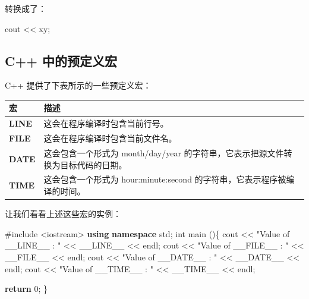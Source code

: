 \documentclass[
]{article}
\newenvironment{Shaded}{}{}
\newcommand{\ControlFlowTok}[1]{\textcolor[rgb]{0.00,0.44,0.13}{\textbf{#1}}}
\newcommand{\DataTypeTok}[1]{\textcolor[rgb]{0.56,0.13,0.00}{#1}}
\newcommand{\DecValTok}[1]{\textcolor[rgb]{0.25,0.63,0.44}{#1}}
\newcommand{\ImportTok}[1]{#1}
\newcommand{\KeywordTok}[1]{\textcolor[rgb]{0.00,0.44,0.13}{\textbf{#1}}}
\newcommand{\NormalTok}[1]{#1}
\newcommand{\OperatorTok}[1]{\textcolor[rgb]{0.40,0.40,0.40}{#1}}
\newcommand{\OtherTok}[1]{\textcolor[rgb]{0.00,0.44,0.13}{#1}}
\newcommand{\PreprocessorTok}[1]{\textcolor[rgb]{0.74,0.48,0.00}{#1}}
\newcommand{\StringTok}[1]{\textcolor[rgb]{0.25,0.44,0.63}{#1}}
\begin{document}
转换成了：

\begin{Shaded}
\begin{Highlighting}[]
\NormalTok{cout }\OperatorTok{\textless{}\textless{}}\NormalTok{ xy}\OperatorTok{;}
\end{Highlighting}
\end{Shaded}

\hypertarget{c-ux4e2dux7684ux9884ux5b9aux4e49ux5b8f}{%
\subsection{C++
中的预定义宏}\label{c-ux4e2dux7684ux9884ux5b9aux4e49ux5b8f}}

C++ 提供了下表所示的一些预定义宏：

\begin{longtable}[]{@{}ll@{}}
\toprule
宏 & 描述 \\
\midrule
\endhead
\textbf{LINE} & 这会在程序编译时包含当前行号。 \\
\textbf{FILE} & 这会在程序编译时包含当前文件名。 \\
\textbf{DATE} & 这会包含一个形式为 month/day/year
的字符串，它表示把源文件转换为目标代码的日期。 \\
\textbf{TIME} & 这会包含一个形式为 hour:minute:second
的字符串，它表示程序被编译的时间。 \\
\bottomrule
\end{longtable}

让我们看看上述这些宏的实例：

\begin{Shaded}
\begin{Highlighting}[]
\PreprocessorTok{\#include }\ImportTok{\textless{}iostream\textgreater{}}
\KeywordTok{using} \KeywordTok{namespace}\NormalTok{ std}\OperatorTok{;}
\DataTypeTok{int}\NormalTok{ main }\OperatorTok{()\{}
\NormalTok{    cout }\OperatorTok{\textless{}\textless{}} \StringTok{"Value of \_\_LINE\_\_ : "} \OperatorTok{\textless{}\textless{}} \OtherTok{\_\_LINE\_\_} \OperatorTok{\textless{}\textless{}}\NormalTok{ endl}\OperatorTok{;}
\NormalTok{    cout }\OperatorTok{\textless{}\textless{}} \StringTok{"Value of \_\_FILE\_\_ : "} \OperatorTok{\textless{}\textless{}} \OtherTok{\_\_FILE\_\_} \OperatorTok{\textless{}\textless{}}\NormalTok{ endl}\OperatorTok{;}
\NormalTok{    cout }\OperatorTok{\textless{}\textless{}} \StringTok{"Value of \_\_DATE\_\_ : "} \OperatorTok{\textless{}\textless{}} \OtherTok{\_\_DATE\_\_} \OperatorTok{\textless{}\textless{}}\NormalTok{ endl}\OperatorTok{;}
\NormalTok{    cout }\OperatorTok{\textless{}\textless{}} \StringTok{"Value of \_\_TIME\_\_ : "} \OperatorTok{\textless{}\textless{}} \OtherTok{\_\_TIME\_\_} \OperatorTok{\textless{}\textless{}}\NormalTok{ endl}\OperatorTok{;}

    \ControlFlowTok{return} \DecValTok{0}\OperatorTok{;}
\OperatorTok{\}}
\end{Highlighting}
\end{Shaded}
\end{document}
